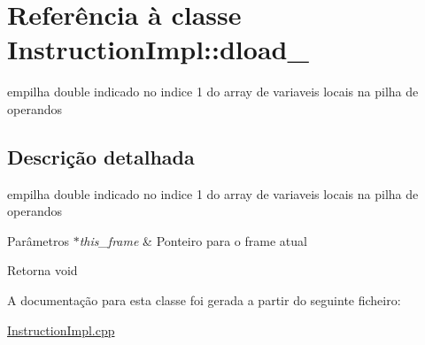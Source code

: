 \hypertarget{class_instruction_impl_1_1dload__1}{}\section{Referência à classe Instruction\+Impl\+:\+:dload\+\_}
\label{class_instruction_impl_1_1dload__1}


empilha double indicado no indice 1 do array de variaveis locais na pilha de operandos  




\subsection{Descrição detalhada}
empilha double indicado no indice 1 do array de variaveis locais na pilha de operandos 


\begin{DoxyParams}{Parâmetros}
{\em $\ast$this\+\_\+frame} & Ponteiro para o frame atual \\
\hline
\end{DoxyParams}
\begin{DoxyReturn}{Retorna}
void 
\end{DoxyReturn}


A documentação para esta classe foi gerada a partir do seguinte ficheiro\+:\begin{DoxyCompactItemize}
\item 
\hyperlink{_instruction_impl_8cpp}{Instruction\+Impl.\+cpp}\end{DoxyCompactItemize}
